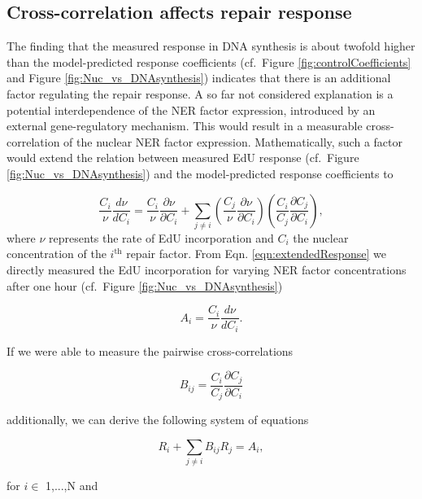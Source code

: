 \subsection{Cross-correlation affects repair response}
\label{sec:crossCorelResponse}
The finding that the measured response in DNA synthesis is about twofold higher than the model-predicted response coefficients (cf.\ Figure \ref{fig:controlCoefficients} and Figure \ref{fig:Nuc_vs_DNAsynthesis}) indicates that there is an additional factor regulating the repair response. A so far not considered explanation is a potential interdependence of the NER factor expression, introduced by an external gene-regulatory mechanism. This would result in a measurable cross-correlation of the nuclear NER factor expression. Mathematically, such a factor would extend the relation between measured EdU response (cf.\ Figure \ref{fig:Nuc_vs_DNAsynthesis}) and the model-predicted response coefficients to 

\begin{equation}
\frac{C_i}{\nu}\frac{d \nu}{d C_i} = \frac{C_i}{\nu}\frac{\partial \nu}{\partial C_i} + \sum_{j \neq i} \left( \frac{C_j}{\nu}\frac{\partial \nu}{\partial C_i}\right) \left(\frac{C_i}{C_j}\frac{\partial C_j}{\partial C_i}\right), 
\label{eqn:extendedResponse}
\end{equation}    
where $\nu$ represents the rate of EdU incorporation and $C_i$ the nuclear concentration of the $i^{\text{th}}$ repair factor. From Eqn. \ref{eqn:extendedResponse} we directly measured the EdU incorporation for varying NER factor concentrations after one hour (cf.\ Figure \ref{fig:Nuc_vs_DNAsynthesis})

\begin{equation}
A_i = \frac{C_i}{\nu}\frac{d \nu}{d C_i}. \nonumber
\end{equation}

If we were able to measure the pairwise cross-correlations

\begin{equation}
B_{ij} = \frac{C_i}{C_j}\frac{\partial C_j}{\partial C_i} \nonumber
\end{equation}

additionally, we can derive the following system of equations


\begin{equation}
R_i + \sum_{j\neq i} B_{ij}R_j = A_i,
\label{eqn:linearEqnSystem}
\end{equation}

for $i \in$ 1,...,N and

